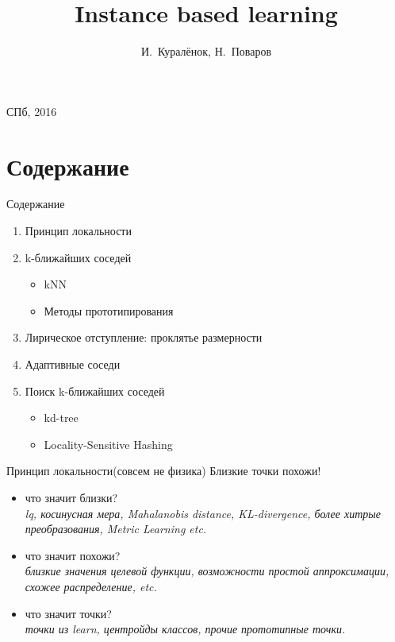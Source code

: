 \documentclass[14pt, fleqn, xcolor={dvipsnames, table}]{beamer}
\title{Instance based learning\\\small{}}
\author[]{\small{%
И.~Куралёнок,
Н.~Поваров}}
\date{}
\begin{document}
\begin{frame}
\maketitle
\small
\begin{center}
\vspace{-60pt}
\vspace{80pt}
\footnotesize СПб, 2016
\end{center}
\end{frame}

\section{Содержание}
\begin{frame}{Содержание}
\begin{enumerate}
  \item Принцип локальности
  \item k-ближайших соседей
  \begin{itemize}
    \item kNN
    \item Методы прототипирования
  \end{itemize}
  \item Лирическое отступление: проклятье размерности
  \item Адаптивные соседи
  \item Поиск k-ближайших соседей
  \begin{itemize}
    \item kd-tree
    \item Locality-Sensitive Hashing
  \end{itemize}
\end{enumerate}
\end{frame}

\begin{frame}{Принцип локальности(совсем не физика)}
  Близкие точки похожи!
  \begin{itemize}
    \item что значит близки? \\
    \emph{lq, косинусная мера, Mahalanobis distance, KL-divergence, более хитрые преобразования, Metric Learning etc.}
    \item что значит похожи? \\
    \emph{близкие значения целевой функции, возможности простой аппроксимации, схожее распределение, etc.}
    \item что значит точки? \\
    \emph{точки из learn, центройды классов, прочие прототипные точки.}
  \end{itemize}
\end{frame}
\end{document}
